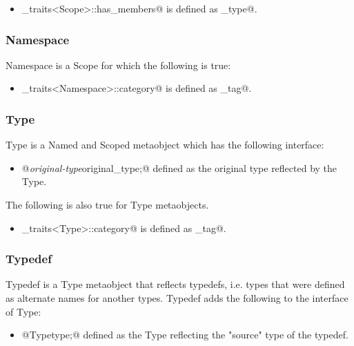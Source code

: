 \begin{itemize}
	\item \verb@metaobject_traits<Scope>::has_members@ is defined as \verb@true_type@.
\end{itemize}

\subsubsection{Namespace}

{\metaobject Namespace} is a {\metaobject Scope} for which the following is true:

\begin{itemize}
	\item \verb@metaobject_traits<Namespace>::category@ is defined as
	\verb@namespace_tag@.
\end{itemize}

\subsubsection{Type}

{\metaobject Type} is a {\metaobject Named} and {\metaobject Scoped} metaobject which
has the following interface:

\begin{itemize}
	\item{\verb@typedef @{\em original-type}\verb@ original_type;@} defined as the original type
	reflected by the {\metaobject Type}.
\end{itemize}

The following is also true for {\metaobject Type} metaobjects.

\begin{itemize}
	\item \verb@metaobject_traits<Type>::category@ is defined as \verb@type_tag@.
\end{itemize}

\subsubsection{Typedef}

{\metaobject Typedef} is a {\metaobject Type} metaobject that reflects typedefs,
i.e. types that were defined as alternate names for another types.
{\metaobject Typedef} adds the following to the interface of {\metaobject Type}:

\begin{itemize}
	\item{\verb@typedef @{\metaobject Type}\verb@ type;@} defined as the {\metaobject Type}
	reflecting the "source" type of the typedef.
\end{itemize}

